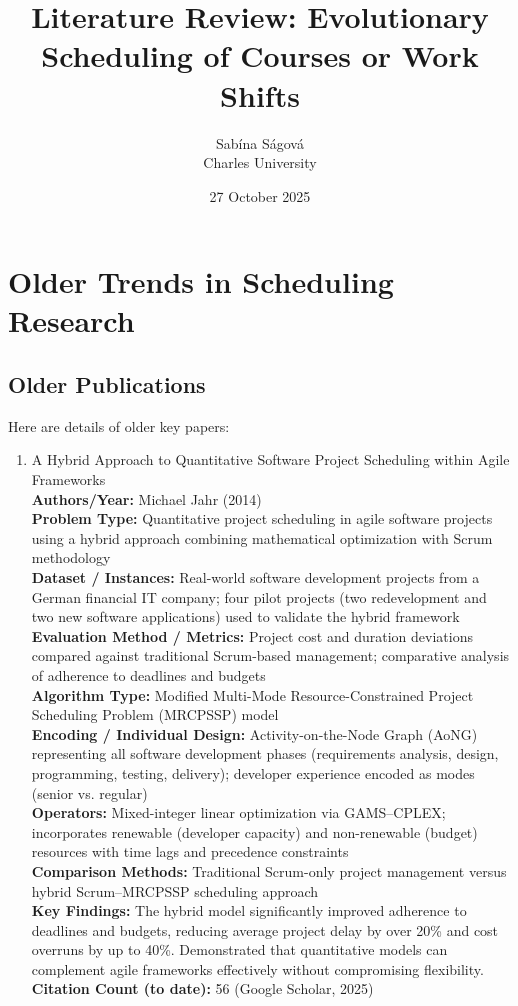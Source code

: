 \documentclass[a4paper,12pt]{article}
\title{Literature Review: Evolutionary Scheduling of Courses or Work Shifts}
\author{Sabína Ságová\\ Charles University}
\date{27 October 2025}
\begin{document}
\maketitle


\section{Older Trends in Scheduling Research}

\subsection{Older Publications}
Here are details of older key papers:
\begin{enumerate}[leftmargin=2em, labelwidth=1em, labelsep=0.5em, itemsep=1ex]

  \item A Hybrid Approach to Quantitative Software Project Scheduling within Agile Frameworks \\
    \textbf{Authors/Year:} Michael Jahr (2014) \\  
    \textbf{Problem Type:} Quantitative project scheduling in agile software projects using a hybrid approach combining mathematical optimization with Scrum methodology \\  
    \textbf{Dataset / Instances:} Real-world software development projects from a German financial IT company; four pilot projects (two redevelopment and two new software applications) used to validate the hybrid framework \\  
    \textbf{Evaluation Method / Metrics:} Project cost and duration deviations compared against traditional Scrum-based management; comparative analysis of adherence to deadlines and budgets \\  
    \textbf{Algorithm Type:} Modified Multi-Mode Resource-Constrained Project Scheduling Problem (MRCPSSP) model \\  
    \textbf{Encoding / Individual Design:} Activity-on-the-Node Graph (AoNG) representing all software development phases (requirements analysis, design, programming, testing, delivery); developer experience encoded as modes (senior vs. regular) \\  
    \textbf{Operators:} Mixed-integer linear optimization via GAMS–CPLEX; incorporates renewable (developer capacity) and non-renewable (budget) resources with time lags and precedence constraints \\  
    \textbf{Comparison Methods:} Traditional Scrum-only project management versus hybrid Scrum–MRCPSSP scheduling approach \\  
    \textbf{Key Findings:} The hybrid model significantly improved adherence to deadlines and budgets, reducing average project delay by over 20\% and cost overruns by up to 40\%. Demonstrated that quantitative models can complement agile frameworks effectively without compromising flexibility. \\  
    \textbf{Citation Count (to date):} 56 (Google Scholar, 2025) \\[2ex]
  

\end{enumerate}
\end{document}
